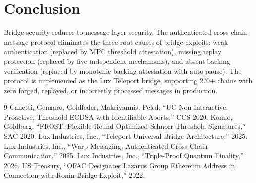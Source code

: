 \section{Conclusion}


Bridge security reduces to message layer security. The authenticated cross-chain message protocol eliminates the three root causes of bridge exploits: weak authentication (replaced by MPC threshold attestation), missing replay protection (replaced by five independent mechanisms), and absent backing verification (replaced by monotonic backing attestation with auto-pause). The protocol is implemented as the Lux Teleport bridge, supporting 270+ chains with zero forged, replayed, or incorrectly processed messages in production.

\begin{thebibliography}{9}
 Canetti, Gennaro, Goldfeder, Makriyannis, Peled, ``UC Non-Interactive, Proactive, Threshold ECDSA with Identifiable Aborts,'' CCS 2020.
 Komlo, Goldberg, ``FROST: Flexible Round-Optimized Schnorr Threshold Signatures,'' SAC 2020.
 Lux Industries, Inc., ``Teleport Universal Bridge Architecture,'' 2025.
 Lux Industries, Inc., ``Warp Messaging: Authenticated Cross-Chain Communication,'' 2025.
 Lux Industries, Inc., ``Triple-Proof Quantum Finality,'' 2026.
 US Treasury, ``OFAC Designates Lazarus Group Ethereum Address in Connection with Ronin Bridge Exploit,'' 2022.
\end{thebibliography}

